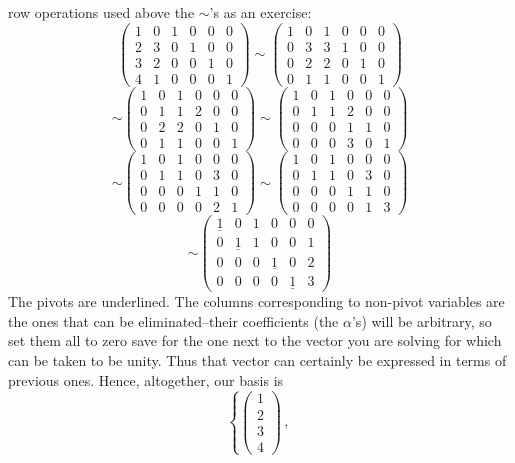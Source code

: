 {row operations used above the $\sim$'s as an exercise:
$$
\begin{pmatrix}
1&0&1&0&0&0\\
2&3&0&1&0&0\\
3&2&0&0&1&0\\
4&1&0&0&0&1
\end{pmatrix}\sim
\begin{pmatrix}
1&0&1&0&0&0\\
0&3&3&1&0&0\\
0&2&2&0&1&0\\
0&1&1&0&0&1
\end{pmatrix}
$$
$$
\sim
\begin{pmatrix}
1&0&1&0&0&0\\
0&1&1&2&0&0\\
0&2&2&0&1&0\\
0&1&1&0&0&1
\end{pmatrix}
\sim
\begin{pmatrix}
1&0&1&0&0&0\\
0&1&1&2&0&0\\
0&0&0&1&1&0\\
0&0&0&3&0&1
\end{pmatrix}
$$
$$
\sim
\begin{pmatrix}
1&0&1&0&0&0\\
0&1&1&0&3&0\\
0&0&0&1&1&0\\
0&0&0&0&2&1
\end{pmatrix}
\sim
\begin{pmatrix}
1&0&1&0&0&0\\
0&1&1&0&3&0\\
0&0&0&1&1&0\\
0&0&0&0&1&3
\end{pmatrix}
$$
$$
\sim
\begin{pmatrix}
\underline1&0&1&0&0&0\\
0&\underline1&1&0&0&1\\
0&0&0&\underline1&0&2\\
0&0&0&0&\underline1&3
\end{pmatrix}
$$
The pivots are underlined.
The columns corresponding to non-pivot variables are the ones that can be eliminated--their coefficients (the $\alpha$'s)
will be arbitrary, so set them all to zero save for the one next to the vector you are solving for which can be taken to be unity.
Thus that vector can certainly be expressed in terms of previous ones. Hence, altogether, our basis is
$$
\left\{
\begin{pmatrix}1\\2\\3\\4\end{pmatrix} \, , \ 
$$}
